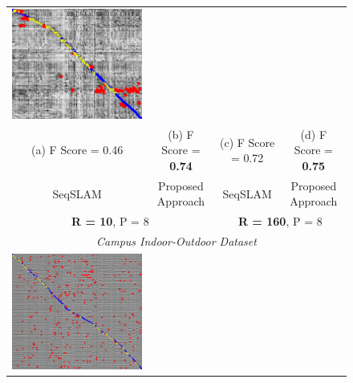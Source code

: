 \documentclass[letterpaper, 10 pt, conference]{ieeeconf}  %
\begin{document}
\begin{figure}
\begin{tabular*}{\textwidth}[t]{cccc}
  \includegraphics[width=\imgW,height=\imgH]{campus-io-with-good-75} \\
  (a) F Score = 0.46 & (b) F Score = \textbf{0.74} & (c) F Score = 0.72 & (d) F Score = \textbf{0.75} \\
  SeqSLAM & Proposed Approach & SeqSLAM & Proposed Approach \\
  \multicolumn{2}{c}{\textbf{R = 10}, P = 8} & \multicolumn{2}{c}{\textbf{R = 160}, P = 8} \\
  \multicolumn{4}{c}{\emph{Campus Indoor-Outdoor Dataset}} \\
  \includegraphics[width=\imgW,height=\imgH]{cta-rail-without-bad-106} &

\end{tabular*}
\end{figure}
\end{document}
